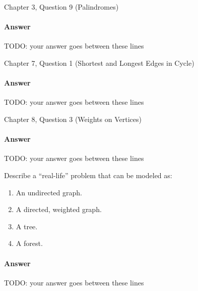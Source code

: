 \documentclass{article}
\begin{document}

\nextprob
{}

Chapter 3, Question 9 (Palindromes)

\paragraph{Answer}


TODO: your answer goes between these lines


\nextprob
{}

Chapter 7, Question 1 (Shortest and Longest Edges in Cycle)

\paragraph{Answer}


TODO: your answer goes between these lines



\nextprob
{}

Chapter 8, Question 3 (Weights on Vertices)

\paragraph{Answer}


TODO: your answer goes between these lines





\nextprob
{}

Describe a ``real-life'' problem that can be modeled as:

\begin{enumerate}
    \item An undirected graph.
    \item A directed, weighted graph.
    \item A tree.
    \item A forest.
\end{enumerate}

\paragraph{Answer}


TODO: your answer goes between these lines
\end{document}
